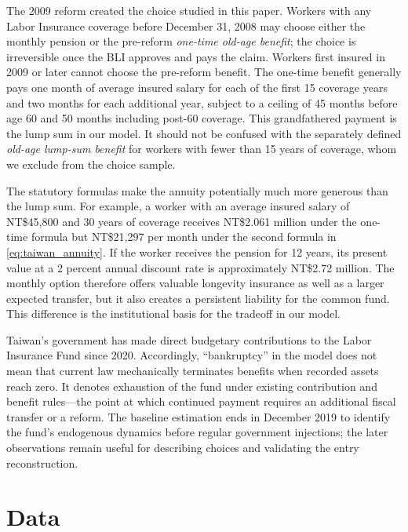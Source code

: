 \documentclass[a4paper, 12pt]{article}
\begin{document}
The 2009 reform created the choice studied in this paper. Workers with any Labor
Insurance coverage before December 31, 2008 may choose either the monthly
pension or the pre-reform \emph{one-time old-age benefit}; the choice is
irreversible once the BLI approves and pays the claim. Workers first insured in
2009 or later cannot choose the pre-reform benefit. The
one-time benefit generally pays one month of average insured salary for each of
the first 15 coverage years and two months for each additional year, subject to
a ceiling of 45 months before age 60 and 50 months including post-60 coverage.
This grandfathered payment is the lump sum in our model. It should not be
confused with the separately defined \emph{old-age lump-sum benefit} for workers
with fewer than 15 years of coverage, whom we exclude from the choice sample.

The statutory formulas make the annuity potentially much more generous than the
lump sum. For example, a worker with an average insured salary of NT\$45,800 and
30 years of coverage receives NT\$2.061 million under the one-time formula but
NT\$21,297 per month under the second formula in \cref{eq:taiwan_annuity}. If the
worker receives the pension for 12 years, its present value at a 2 percent annual
discount rate is approximately NT\$2.72 million. The monthly option therefore
offers valuable longevity insurance as well as a larger expected transfer, but
it also creates a persistent liability for the common fund. This difference is
the institutional basis for the tradeoff in our model.

Taiwan's government has made direct budgetary contributions to the Labor
Insurance Fund since 2020. Accordingly, ``bankruptcy'' in the model
does not mean that current law mechanically terminates benefits when recorded
assets reach zero. It denotes exhaustion of the fund under existing contribution
and benefit rules---the point at which continued payment requires an additional
fiscal transfer or a reform. The baseline estimation ends in December 2019 to
identify the fund's endogenous dynamics before regular government injections;
the later observations remain useful for describing choices and validating the
entry reconstruction.

\section{Data}
\end{document}
